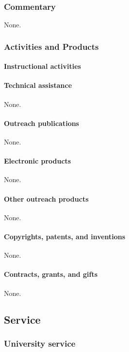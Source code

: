 \subsubsection{Commentary}
None.

\subsubsection{Activities and Products}

\paragraph{Instructional activities}


\paragraph{Technical assistance}
None.

\paragraph{Outreach publications}
None.

\paragraph{Electronic products}
None.

\paragraph{Other outreach products}
None.

\paragraph{Copyrights, patents, and inventions}
None.

\paragraph{Contracts, grants, and gifts}
None.

\subsection{Service}

\subsubsection{University service}


